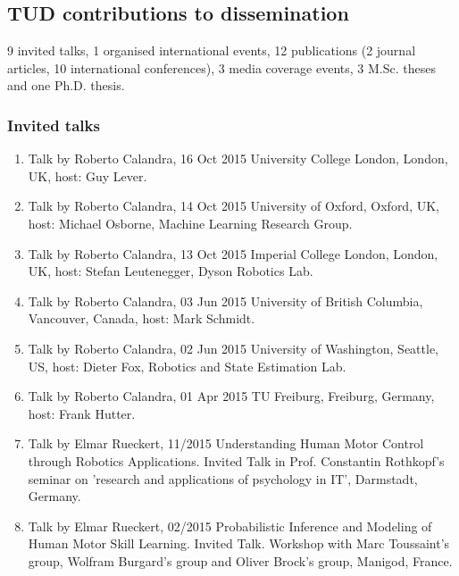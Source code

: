 \subsection{TUD contributions to dissemination}

9 invited talks, 1 organised international events, 12 publications (2 journal articles, 10 international conferences), 3 media coverage events, 3 M.Sc. theses and one Ph.D. thesis. 

\subsubsection{Invited talks}

\begin{enumerate}

\item Talk by Roberto Calandra, 16 Oct 2015 University College London, London, UK, host: Guy Lever.
\item Talk by Roberto Calandra, 14 Oct 2015 University of Oxford, Oxford, UK, host: Michael Osborne, Machine Learning Research Group.
\item Talk by Roberto Calandra, 13 Oct 2015 Imperial College London, London, UK, host: Stefan Leutenegger, Dyson Robotics Lab.
\item Talk by Roberto Calandra, 03 Jun 2015 University of British Columbia, Vancouver, Canada, host: Mark Schmidt.
\item Talk by Roberto Calandra, 02 Jun 2015 University of Washington, Seattle, US, host: Dieter Fox, Robotics and State Estimation Lab.
\item Talk by Roberto Calandra, 01 Apr 2015 TU Freiburg, Freiburg, Germany, host: Frank Hutter.

\item Talk by Elmar Rueckert, 11/2015 Understanding Human Motor Control through Robotics Applications. Invited Talk in Prof. Constantin Rothkopf’s seminar on ’research and applications of psychology in IT’, Darmstadt, Germany.
\item Talk by Elmar Rueckert, 02/2015 Probabilistic Inference and Modeling of Human Motor Skill Learning. Invited Talk. Workshop with Marc Toussaint’s group, Wolfram Burgard’s group and Oliver Brock’s group, Manigod, France.



\end{enumerate}
